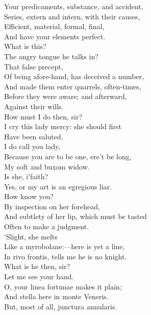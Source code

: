 \documentclass[a4paper,oneside]{memoir}
\begin{document}
\begin{drama*}
Your predicaments, substance, and accident,\\
Series, extern and intern, with their causes,\\
Efficient, material, formal, final,\\
And have your elements perfect.\\
\kastrilspeaks {} What is this?\\
The angry tongue he talks in?\\
\subtlespeaks {} That false precept,\\
Of being afore-hand, has deceived a number,\\
And made them enter quarrels, often-times,\\
Before they were aware; and afterward,\\
Against their wills.\\
\kastrilspeaks {} How must I do then, sir?\\
\subtlespeaks I cry this lady mercy: she should first\\
Have been saluted.\\
I do call you lady,\\
Because you are to be one, ere't be long,\\
My soft and buxom widow.\\
\kastrilspeaks {} Is she, i'faith?\\
\subtlespeaks Yes, or my art is an egregious liar.\\
\kastrilspeaks How know you?\\
\subtlespeaks {} By inspection on her forehead,\\
And subtlety of her lip, which must be tasted\\
Often to make a judgment.\\
'Slight, she melts\\
Like a myrobolane:---here is yet a line,\\
In rivo frontis, tells me he is no knight.\\
\pliantspeaks What is he then, sir?\\
\subtlespeaks {} Let me see your hand.\\
O, your linea fortunae makes it plain;\\
And stella here in monte Veneris.\\
But, most of all, junctura annularis.\\

\end{drama*}
\end{document}
